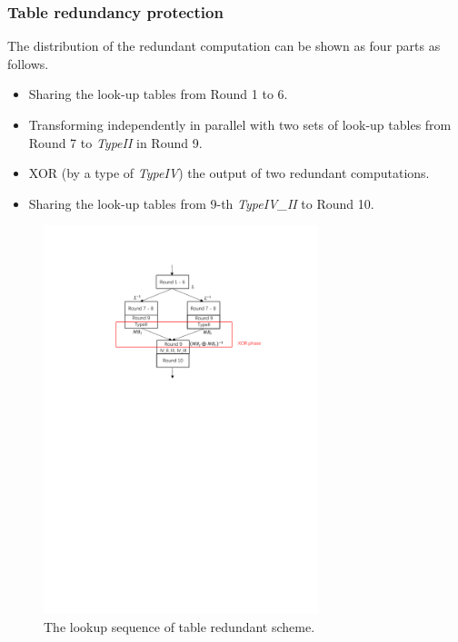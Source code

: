 \documentclass{beamer}
\begin{document}
\frame
{
	\frametitle{Table redundancy protection}
	The distribution of the redundant computation can be shown as four parts as follows.
	\begin{itemize}
		\item Sharing the look-up tables from Round 1 to 6.
		\item Transforming independently in parallel with two sets of look-up tables from Round 7 to \textit{TypeII} in Round 9.
		\item XOR (by a type of \textit{TypeIV}) the output of two redundant computations.
		\item Sharing the look-up tables from 9-th \textit{TypeIV\_II} to Round 10.
	\end{itemize}
}

\frame
{
	\begin{figure}
		\centering
		\includegraphics[width=8cm]{./pics/TRS1.pdf}
		\caption{The lookup sequence of table redundant scheme.}
	\end{figure}
}
\end{document}
